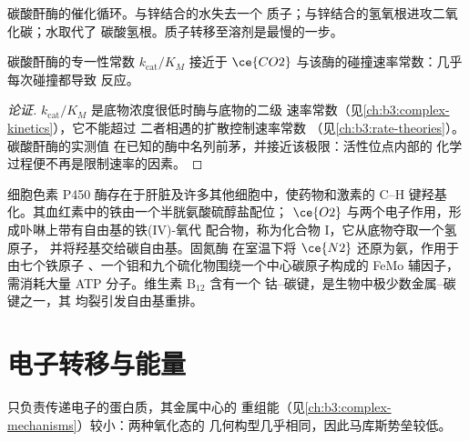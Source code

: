 \begin{omfigure}

{\small 碳酸酐酶的催化循环。与锌结合的水失去一个
质子；与锌结合的氢氧根进攻二氧化碳；水取代了
碳酸氢根。质子转移至溶剂是最慢的一步。}
\end{omfigure}

\begin{proposition}[快速的酶]\label{prop:b3:bioinorganic:carbonic-anhydrase}
碳酸酐酶的专一性常数 $k_{\mathrm{cat}}/K_M$ 接近于
$\ce{CO2}$ 与该酶的碰撞速率常数：几乎每次碰撞都导致
反应。
\end{proposition}

\begin{proof}[论证]
$k_{\mathrm{cat}}/K_M$ 是底物浓度很低时酶与底物的二级
速率常数（见\cref{ch:b3:complex-kinetics}），它不能超过
二者相遇的扩散控制速率常数
（见\cref{ch:b3:rate-theories}）。碳酸酐酶的实测值
在已知的酶中名列前茅，并接近该极限：活性位点内部的
化学过程便不再是限制速率的因素。
\end{proof}

细胞色素 P450 酶存在于肝脏及许多其他细胞中，使药物和激素的 C--H
键羟基化。其血红素中的铁由一个半胱氨酸硫醇盐配位；
$\ce{O2}$ 与两个电子作用，形成卟啉上带有自由基的铁(IV)-氧代
配合物，称为化合物 I，它从底物夺取一个氢原子，
并将羟基交给碳自由基。固氮酶
在室温下将 $\ce{N2}$ 还原为氨，作用于由七个铁原子
、一个钼和九个硫化物围绕一个中心碳原子构成的 FeMo
辅因子，需消耗大量 ATP 分子。维生素 $\mathrm{B_{12}}$ 含有一个
钴–碳键，是生物中极少数金属–碳键之一，其
均裂引发自由基重排。

\section{电子转移与能量}

只负责传递电子的蛋白质，其金属中心的
重组能（见\cref{ch:b3:complex-mechanisms}）较小：两种氧化态的
几何构型几乎相同，因此马库斯势垒较低。


